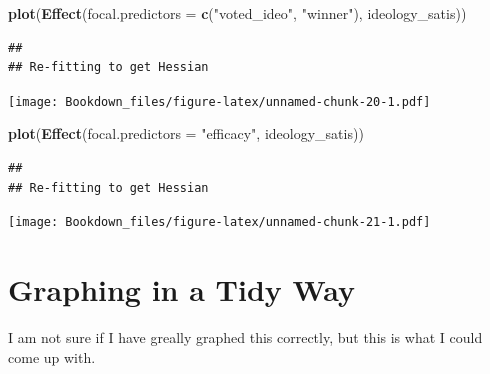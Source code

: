 \documentclass[]{book}
\newenvironment{Shaded}{\begin{snugshade}}{\end{snugshade}}
\newcommand{\KeywordTok}[1]{\textcolor[rgb]{0.13,0.29,0.53}{\textbf{#1}}}
\newcommand{\DataTypeTok}[1]{\textcolor[rgb]{0.13,0.29,0.53}{#1}}
\newcommand{\StringTok}[1]{\textcolor[rgb]{0.31,0.60,0.02}{#1}}
\newcommand{\NormalTok}[1]{#1}
\begin{document}
\begin{Shaded}
\begin{Highlighting}[]
\KeywordTok{plot}\NormalTok{(}\KeywordTok{Effect}\NormalTok{(}\DataTypeTok{focal.predictors =} \KeywordTok{c}\NormalTok{(}\StringTok{"voted_ideo"}\NormalTok{, }\StringTok{"winner"}\NormalTok{), ideology_satis))}
\end{Highlighting}
\end{Shaded}

\begin{verbatim}
## 
## Re-fitting to get Hessian
\end{verbatim}

\texttt{[image: Bookdown\_files/figure-latex/unnamed-chunk-20-1.pdf]}

\begin{Shaded}
\begin{Highlighting}[]
\KeywordTok{plot}\NormalTok{(}\KeywordTok{Effect}\NormalTok{(}\DataTypeTok{focal.predictors =} \StringTok{"efficacy"}\NormalTok{, ideology_satis))}
\end{Highlighting}
\end{Shaded}

\begin{verbatim}
## 
## Re-fitting to get Hessian
\end{verbatim}

\texttt{[image: Bookdown\_files/figure-latex/unnamed-chunk-21-1.pdf]}

\chapter{Graphing in a Tidy Way}\label{graphing-in-a-tidy-way}

I am not sure if I have greally graphed this correctly, but this is what
I could come up with.
\end{document}
